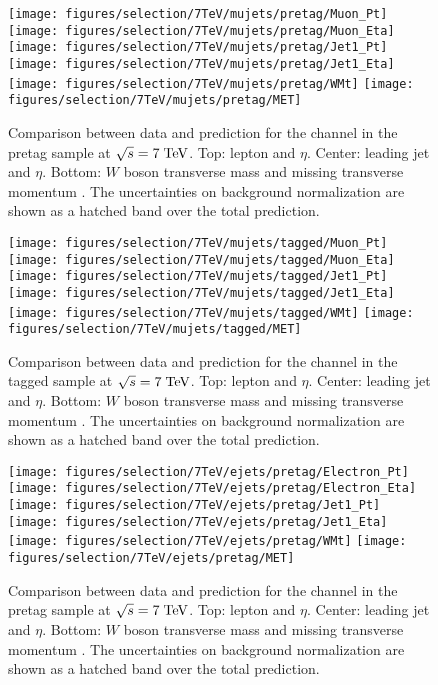 \begin{figure}
  \centering
  \texttt{[image: figures/selection/7TeV/mujets/pretag/Muon\_Pt]}
  \texttt{[image: figures/selection/7TeV/mujets/pretag/Muon\_Eta]}
  \texttt{[image: figures/selection/7TeV/mujets/pretag/Jet1\_Pt]}
  \texttt{[image: figures/selection/7TeV/mujets/pretag/Jet1\_Eta]}
  \texttt{[image: figures/selection/7TeV/mujets/pretag/WMt]}
  \texttt{[image: figures/selection/7TeV/mujets/pretag/MET]}
  \caption{
    Comparison between data and prediction for the \mujets{}
    channel in the pretag sample at $\sqrt{s} = 7 \; \mathrm{TeV}{}$. Top: lepton \pt{} and
    $\eta$. Center: leading jet \pt{} and $\eta$. Bottom: $W$ boson
    transverse mass \mtw{} and missing transverse momentum \met{}.
    The uncertainties on background normalization are shown as a
    hatched band over the total prediction.
  }
  \label{fig:2011mu_pretag}
\end{figure}
%
\begin{figure}
\centering
\texttt{[image: figures/selection/7TeV/mujets/tagged/Muon\_Pt]}
\texttt{[image: figures/selection/7TeV/mujets/tagged/Muon\_Eta]}
\texttt{[image: figures/selection/7TeV/mujets/tagged/Jet1\_Pt]}
\texttt{[image: figures/selection/7TeV/mujets/tagged/Jet1\_Eta]}
\texttt{[image: figures/selection/7TeV/mujets/tagged/WMt]}
\texttt{[image: figures/selection/7TeV/mujets/tagged/MET]}
\caption{
    Comparison between data and prediction for the \mujets{}
    channel in the tagged sample at $\sqrt{s} = 7 \; \mathrm{TeV}{}$. Top: lepton \pt{} and
    $\eta$. Center: leading jet \pt{} and $\eta$. Bottom: $W$ boson
    transverse mass \mtw{} and missing transverse momentum \met{}.
    The uncertainties on background normalization are shown as a
    hatched band over the total prediction.
}
\label{fig:2011mu_tagged}
\end{figure}
%
\begin{figure}
  \centering
  \texttt{[image: figures/selection/7TeV/ejets/pretag/Electron\_Pt]}
  \texttt{[image: figures/selection/7TeV/ejets/pretag/Electron\_Eta]}
  \texttt{[image: figures/selection/7TeV/ejets/pretag/Jet1\_Pt]}
  \texttt{[image: figures/selection/7TeV/ejets/pretag/Jet1\_Eta]}
  \texttt{[image: figures/selection/7TeV/ejets/pretag/WMt]}
  \texttt{[image: figures/selection/7TeV/ejets/pretag/MET]}
  \caption{
    Comparison between data and prediction for the \ejets{}
    channel in the pretag sample at $\sqrt{s} = 7 \; \mathrm{TeV}{}$. Top: lepton \pt{} and
    $\eta$. Center: leading jet \pt{} and $\eta$. Bottom: $W$ boson
    transverse mass \mtw{} and missing transverse momentum \met{}.
    The uncertainties on background normalization are shown as a
    hatched band over the total prediction.
  } 
  \label{fig:2011ele_pretag}
\end{figure}
